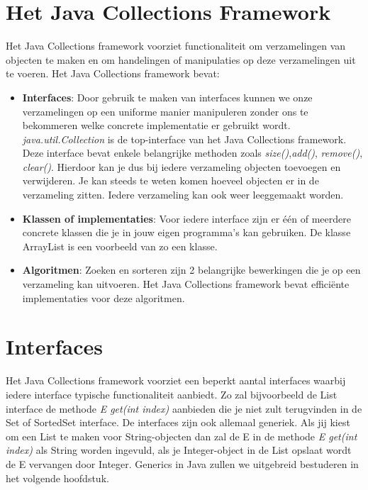 \documentclass{tstextbook}
\begin{document}
\section{Het Java Collections Framework}

Het Java Collections framework voorziet functionaliteit om verzamelingen van objecten te maken en om handelingen of manipulaties op deze verzamelingen uit te voeren. 
Het Java Collections framework bevat:
\begin{itemize}
\item \textbf{Interfaces}: Door gebruik te maken van interfaces kunnen we onze verzamelingen op een uniforme manier manipuleren zonder ons te bekommeren welke concrete implementatie er gebruikt wordt. \textit{java.util.Collection} is de top-interface van het Java Collections framework. Deze interface bevat enkele belangrijke methoden zoals \textit{size()},\textit{add()}, \textit{remove()}, \textit{clear()}. Hierdoor kan je dus bij iedere verzameling objecten toevoegen en verwijderen. Je kan steeds te weten komen hoeveel objecten er in de verzameling zitten. Iedere verzameling kan ook weer leeggemaakt worden.
\item \textbf{Klassen of implementaties}: Voor iedere interface zijn er \'e\'en of meerdere concrete klassen die je in jouw eigen programma's kan gebruiken. De klasse ArrayList is een voorbeeld van zo een klasse.
\item \textbf{Algoritmen}: Zoeken en sorteren zijn 2 belangrijke bewerkingen die je op een verzameling kan uitvoeren. Het Java Collections framework bevat effici\"ente implementaties voor deze algoritmen.
\end{itemize}

\section{Interfaces}

Het Java Collections framework voorziet een beperkt aantal interfaces waarbij iedere interface typische functionaliteit aanbiedt. Zo zal bijvoorbeeld de List interface de methode \textit{E get(int index)} aanbieden die je niet zult terugvinden in de Set of SortedSet interface. De interfaces zijn ook allemaal generiek. Als jij kiest om een List te maken voor String-objecten dan zal de E in de methode \textit{E get(int index)} als String worden ingevuld, als je Integer-object in de List opslaat wordt de E vervangen door Integer. Generics in Java zullen we uitgebreid bestuderen in het volgende hoofdstuk.
\end{document}
